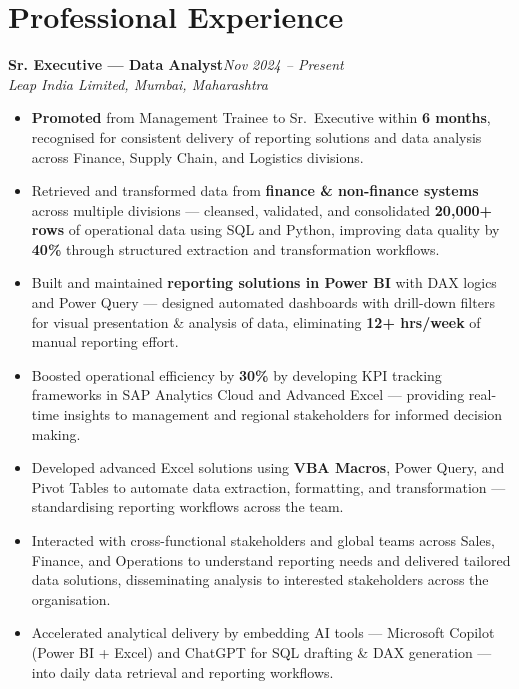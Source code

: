 \documentclass[10pt, letterpaper]{article}
\newcommand{\role}[3]{%
  \vspace{2pt}%
  {\bfseries #1}\hfill{\small\color{muted}\textit{#3}}\\[-2pt]%
  {\small\color{muted}\textit{#2}}%
}
\begin{document}
\section{Professional Experience}

\role{Sr. Executive — Data Analyst}{Leap India Limited, Mumbai, Maharashtra}{Nov 2024 -- Present}

\begin{itemize}
  \item \textbf{Promoted} from Management Trainee to Sr.\ Executive within \textbf{6 months}, recognised for consistent delivery of reporting solutions and data analysis across Finance, Supply Chain, and Logistics divisions.
  \item Retrieved and transformed data from \textbf{finance \& non-finance systems} across multiple divisions — cleansed, validated, and consolidated \textbf{20,000+ rows} of operational data using SQL and Python, improving data quality by \textbf{40\%} through structured extraction and transformation workflows.
  \item Built and maintained \textbf{reporting solutions in Power BI} with DAX logics and Power Query — designed automated dashboards with drill-down filters for visual presentation \& analysis of data, eliminating \textbf{12+ hrs/week} of manual reporting effort.
  \item Boosted operational efficiency by \textbf{30\%} by developing KPI tracking frameworks in SAP Analytics Cloud and Advanced Excel — providing real-time insights to management and regional stakeholders for informed decision making.
  \item Developed advanced Excel solutions using \textbf{VBA Macros}, Power Query, and Pivot Tables to automate data extraction, formatting, and transformation — standardising reporting workflows across the team.
  \item Interacted with cross-functional stakeholders and global teams across Sales, Finance, and Operations to understand reporting needs and delivered tailored data solutions, disseminating analysis to interested stakeholders across the organisation.
  \item Accelerated analytical delivery by embedding AI tools — Microsoft Copilot (Power BI + Excel) and ChatGPT for SQL drafting \& DAX generation — into daily data retrieval and reporting workflows.
\end{itemize}

\vspace{1pt}
\end{document}
